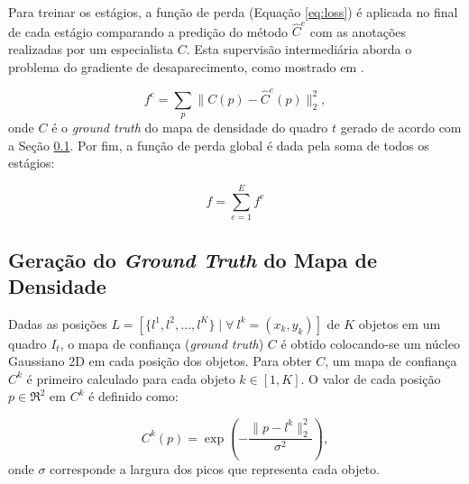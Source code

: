 
Para treinar os estágios, a função de perda (Equação \ref{eq:loss}) é aplicada no final de cada estágio comparando a predição do método $\hat{C}^{e}$ com as anotações realizadas por um especialista $C$.
Esta supervisão intermediária aborda o problema do gradiente de desaparecimento, como mostrado em \cite{Cao2017}.

\begin{equation}
f^{e} = \sum_p \parallel C(p) - \hat{C}^{e}(p)\parallel^2_2,
\label{eq:loss}
\end{equation}
onde $C$ é o \textit{ground truth} do mapa de densidade do quadro $t$ gerado de acordo com a Seção \ref{sec:geracao_mapa}. Por fim, a função de perda global é dada pela soma de todos os estágios:

\begin{equation}
f = \sum_{e=1}^{E} f^{e}
\end{equation}

\subsection{Geração do \textit{Ground Truth} do Mapa de Densidade}
\label{sec:geracao_mapa}

Dadas as posições $L = [\{l^1, l^2, \dots, l^K \} \mid \forall \: l^k = (x_k, y_k)]$ de $K$ objetos em um quadro $I_t$, o mapa de confiança (\textit{ground truth}) $C$ é obtido colocando-se um núcleo Gaussiano 2D em cada posição dos objetos. 
Para obter $C$, um mapa de confiança $C^k$ é primeiro calculado para cada objeto $k \in [1, K]$.
O valor de cada posição $p \in \Re^2$ em $C^k$ é definido como:

\begin{equation}
C^k(p) = \exp \left(- \frac{\| p - l^k \|^2_2}{\sigma^2}\right),
\end{equation}
onde $\sigma$ corresponde a largura dos picos que representa cada objeto.

